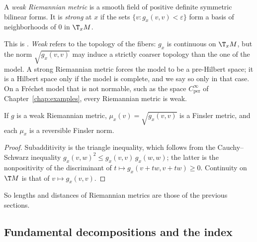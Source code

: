 \begin{definition}
  \label{def:weak-riemannian}
  \leanok
  A \emph{weak Riemannian metric} is a smooth field of positive definite symmetric bilinear forms.
  It is \emph{strong} at $x$ if the sets $\{v : g_x(v,v) < \varepsilon\}$ form a basis of
  neighborhoods of $0$ in $\T_x M$.
\end{definition}

This is \cite[Definition~4.1]{Sch23}. \emph{Weak} refers to the topology of the fibers: $g_x$ is
continuous on $\T_x M$, but the norm $\sqrt{g_x(v,v)}$ may induce a strictly coarser topology than
the one of the model. A strong Riemannian metric forces the model to be a pre-Hilbert space; it is
a Hilbert space only if the model is complete, and we say so only in that case. On a Fréchet model
that is not normable, such as the space $C^\infty_{\mathrm{per}}$ of Chapter~\ref{chap:examples},
every Riemannian metric is weak.

\begin{theorem}
  \label{thm:mt-riemannian-finsler}
  \leanok
  If $g$ is a weak Riemannian metric, $\mu_x(v) = \sqrt{g_x(v, v)}$ is a Finsler metric, and each
  $\mu_x$ is a reversible Finsler norm.
\end{theorem}

\begin{proof}
  \leanok
  Subadditivity is the triangle inequality, which follows from the Cauchy--Schwarz inequality
  $g_x(v,w)^2 \le g_x(v,v)\,g_x(w,w)$; the latter is the nonpositivity of the discriminant of
  $t \mapsto g_x(v + t w, v + t w) \ge 0$. Continuity on $\T M$ is that of $v \mapsto g_x(v,v)$.
\end{proof}

So lengths and distances of Riemannian metrics are those of the previous sections.

\subsection{Fundamental decompositions and the index}

